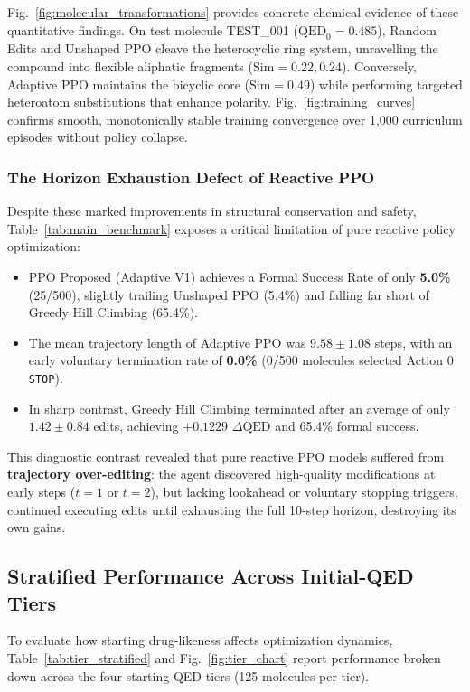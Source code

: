 \documentclass{ieeeaccess}
\begin{document}
Fig.~\ref{fig:molecular_transformations} provides concrete chemical evidence of these quantitative findings. On test molecule TEST\_001 ($\text{QED}_0 = 0.485$), Random Edits and Unshaped PPO cleave the heterocyclic ring system, unravelling the compound into flexible aliphatic fragments ($\text{Sim} = 0.22, 0.24$). Conversely, Adaptive PPO maintains the bicyclic core ($\text{Sim} = 0.49$) while performing targeted heteroatom substitutions that enhance polarity. Fig.~\ref{fig:training_curves} confirms smooth, monotonically stable training convergence over 1,000 curriculum episodes without policy collapse.

\subsubsection{The Horizon Exhaustion Defect of Reactive PPO}
Despite these marked improvements in structural conservation and safety, Table~\ref{tab:main_benchmark} exposes a critical limitation of pure reactive policy optimization:
\begin{itemize}
    \item PPO Proposed (Adaptive V1) achieves a Formal Success Rate of only \textbf{5.0\%} (25/500), slightly trailing Unshaped PPO (5.4\%) and falling far short of Greedy Hill Climbing (65.4\%).
    \item The mean trajectory length of Adaptive PPO was $9.58 \pm 1.08$ steps, with an early voluntary termination rate of \textbf{0.0\%} (0/500 molecules selected Action 0 \texttt{STOP}).
    \item In sharp contrast, Greedy Hill Climbing terminated after an average of only $\mathbf{1.42 \pm 0.84}$ edits, achieving $+0.1229$ $\Delta\text{QED}$ and 65.4\% formal success.
\end{itemize}
This diagnostic contrast revealed that pure reactive PPO models suffered from \textbf{trajectory over-editing}: the agent discovered high-quality modifications at early steps ($t=1$ or $t=2$), but lacking lookahead or voluntary stopping triggers, continued executing edits until exhausting the full 10-step horizon, destroying its own gains.

\subsection{Stratified Performance Across Initial-QED Tiers}
To evaluate how starting drug-likeness affects optimization dynamics, Table~\ref{tab:tier_stratified} and Fig.~\ref{fig:tier_chart} report performance broken down across the four starting-QED tiers (125 molecules per tier).
\end{document}
